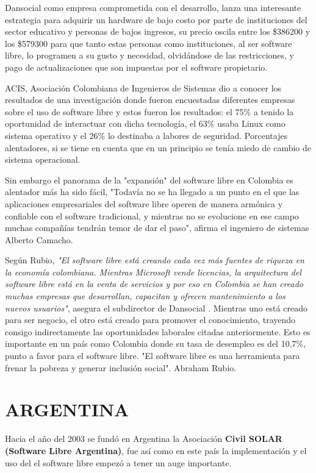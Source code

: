 Dansocial como empresa comprometida con el desarrollo, lanza una interesante estrategia para adquirir un hardware de bajo costo por parte de instituciones del sector educativo y 
personas de bajos ingresos, su precio oscila entre los \$386200 y los \$579300 para que tanto estas personas como instituciones, al ser software libre, lo programen a su gusto y 
necesidad, olvidándose de las restricciones, y pago de actualizaciones que son impuestas por el software propietario.

ACIS, Asociación Colombiana de Ingenieros de Sistemas dio a conocer los resultados de una investigación donde fueron encuestadas diferentes empresas sobre el uso de software 
libre y estos fueron los resultados: el 75\% a tenido la oportunidad de interactuar con dicha tecnología, el 63\% usaba Linux como sistema operativo y el 26\% lo destinaba a 
labores de seguridad. Porcentajes alentadores, si se tiene en cuenta que en un principio se tenía miedo de cambio de sistema operacional. 

Sin embargo el panorama de la "expansión" del software libre en Colombia es alentador más ha sido fácil, "Todavía no se ha llegado a un punto en el que las aplicaciones 
empresariales del software libre operen de manera armónica y confiable con el software tradicional, y mientras no se evolucione en ese campo muchas compañías tendrán temor de dar 
el paso", afirma el ingeniero de sistemas Alberto Camacho. 

Según Rubio, \textit{"El software libre está creando cada vez más fuentes de riqueza en la economía colombiana. Mientras Microsoft vende licencias, la arquitectura del software 
libre está en la venta de servicios y por eso en Colombia se han creado muchas empresas que desarrollan, capacitan y ofrecen mantenimiento a los nuevos usuarios"}, asegura el 
subdirector de Dansocial . Mientras uno está creado para ser negocio, el otro está creado para promover el conocimiento, trayendo consigo indirectamente las oportunidades 
laborales citadas anteriormente. Esto es importante en un país como Colombia donde su tasa de desempleo es del 10,7\%, punto a favor para el software libre. "El software libre es 
una herramienta para frenar la pobreza y generar inclusión social". Abraham Rubio. 


\section*{ARGENTINA}
Hacia el año del 2003 se fundó en  Argentina la Asociación \textbf{Civil SOLAR (Software Libre Argentina)}, fue así como en este país la implementación y el uso del el software 
libre empezó a tener un auge importante.

